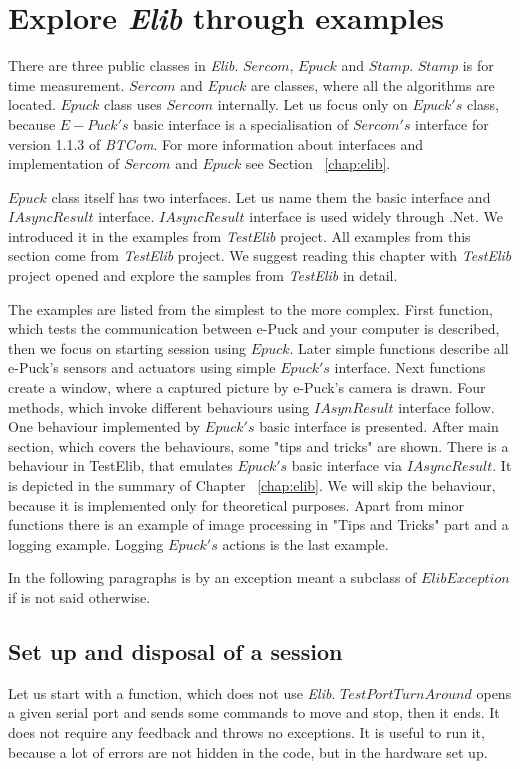 \section{Explore {\it Elib} through examples} \label{sec:interfaces}
  There are three public classes in {\it Elib}. $Sercom$, $Epuck$ and $Stamp$.
  $Stamp$ is for time measurement. $Sercom$ and $Epuck$ are classes, where all the algorithms are located.
  $Epuck$ class uses $Sercom$ internally.
  Let us focus only on $Epuck's$ class, because $E-Puck's$ basic interface is a specialisation of $Sercom's$
  interface for version 1.1.3 of {\it BTCom}.
  For more information about interfaces and implementation of $Sercom$ and $Epuck$ see Section ~\ref{chap:elib}.

  $Epuck$ class itself has two interfaces. Let us name them the basic interface and $IAsyncResult$ interface.
  $IAsyncResult$ interface is used widely through .Net. We introduced it in the examples from {\it TestElib} project.
  All examples from this section come from {\it TestElib} project. We suggest reading this chapter with {\it TestElib} project opened
  and explore the samples from {\it TestElib} in detail.

  The examples are listed from the simplest to the more complex. 
  First function, which tests the communication between e-Puck and your computer is described,
  then we focus on starting session using $Epuck$.
  Later simple functions describe all e-Puck's sensors and actuators using simple $Epuck's$ interface.
  Next functions create a window, where a captured picture by e-Puck's camera is drawn.
  Four methods, which invoke different behaviours using $IAsynResult$ interface follow.
  One behaviour implemented by $Epuck's$ basic interface is presented.
  After main section, which covers the behaviours, some "tips and tricks" are shown.
  There is a behaviour in TestElib, that emulates $Epuck's$ basic interface via $IAsyncResult$. 
  It is depicted in the summary of Chapter ~\ref{chap:elib}.
  We will skip the behaviour, because it is implemented only for theoretical purposes.
  Apart from minor functions there is an example of image processing in "Tips and Tricks" part and a logging example.
  Logging $Epuck's$ actions is the last example.

  In the following paragraphs is by an exception meant a subclass of $ElibException$ if is not said otherwise.
\subsection{Set up and disposal of a session}\label{sec:session}
  Let us start with a function, which does not use {\it Elib}. $TestPortTurnAround$ opens a given serial port
  and sends some commands to move and stop, then it ends. It does not require any feedback and throws no exceptions.
  It is useful to run it, because a lot of errors are not hidden in the code, but in the hardware set up.

